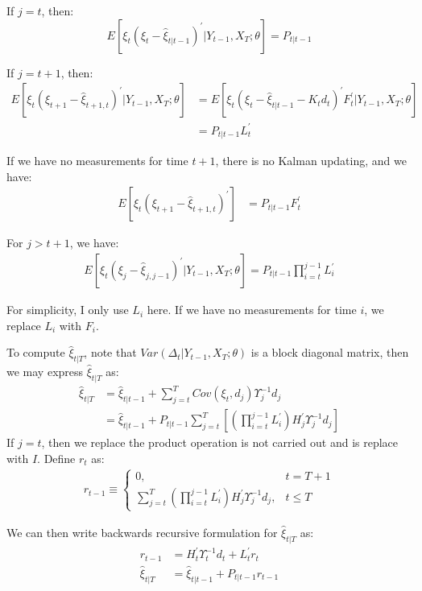 \documentclass[10pt, titlepage]{article}
\numberwithin{equation}{section}
\begin{document}
If $j=t$, then:
\[
    E[\xi_t(\xi_t-\hat{\xi}_{t|t-1})^{'}|Y_{t-1},X_T;\theta] = P_{t|t-1}
\]

If $j=t+1$, then:
\begin{align*}
    E[\xi_t(\xi_{t+1}-\hat{\xi}_{t+1,t})^{'}|Y_{t-1},X_T;\theta] &= E[\xi_t(\xi_t-\hat{\xi}_{t|t-1}-K_td_t)^{'}F_t^{'}|Y_{t-1},X_T;\theta] \\
    &= P_{t|t-1}L_t^{'}
\end{align*}

If we have no measurements for time $t+1$, there is no Kalman updating, and we have:
\begin{align*}
    E[\xi_t(\xi_{t+1}-\hat{\xi}_{t+1,t})^{'}]&= P_{t|t-1}F_t^{'}
\end{align*}

For $j>t+1$, we have:
\begin{align*}
    E[\xi_t(\xi_{j}-\hat{\xi}_{j,j-1})^{'}|Y_{t-1},X_T;\theta] = P_{t|t-1}\prod_{i=t}^{j-1}L_i^{'}
\end{align*}

For simplicity, I only use $L_i$ here. If we have no measurements for time $i$, we replace $L_i$ with $F_i$. 

To compute $\hat{\xi}_{t|T}$, note that $Var(\Delta_{t}|Y_{t-1},X_T;\theta)$ is a block diagonal matrix, then we may express $\hat{\xi}_{t|T}$ as:
\begin{align*}
    \hat{\xi}_{t|T} &= \hat{\xi}_{t|t-1} + \sum_{j=t}^{T}Cov(\xi_t,d_j)\Upsilon_j^{-1}d_j \\
    &= \hat{\xi}_{t|t-1} + P_{t|t-1}\sum_{j=t}^T\left[\left(\prod_{i=t}^{j-1}L_{i}^{'}\right)H_j^{'}\Upsilon_j^{-1}d_j\right]
\end{align*}
If $j=t$, then we replace the product operation is not carried out and is replace with $I$. Define $r_t$ as:
\begin{align*}
    r_{t-1} \equiv \begin{cases}
        0, & t=T+1 \\
        \sum_{j=t}^T\left(\prod_{i=t}^{j-1}L_{i}^{'}\right)H_j^{'}\Upsilon_j^{-1}d_j, & t\leq T
    \end{cases}
\end{align*}

We can then write backwards recursive formulation for $\hat{\xi}_{t|T}$ as:
\begin{align*}
    r_{t-1} &= H_t^{'}\Upsilon_t^{-1}d_t + L_t^{'}r_t \\
    \hat{\xi}_{t|T} &= \hat{\xi}_{t|t-1} + P_{t|t-1}r_{t-1} 
\end{align*}
\end{document}
